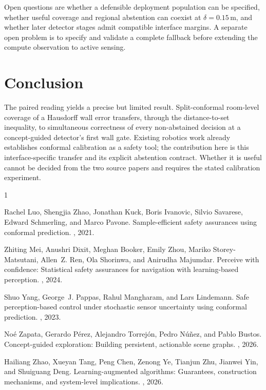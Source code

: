 \documentclass{article}
\begin{document}
Open questions are whether a defensible deployment population can be specified, whether useful coverage and regional abstention can coexist at $\delta=0.15\,\mathrm{m}$, and whether later detector stages admit compatible interface margins. A separate open problem is to specify and validate a complete fallback before extending the compute observation to active sensing.

\section{Conclusion}

The paired reading yields a precise but limited result. Split-conformal room-level coverage of a Hausdorff wall error transfers, through the distance-to-set inequality, to simultaneous correctness of every non-abstained decision at a concept-guided detector's first wall gate. Existing robotics work already establishes conformal calibration as a safety tool; the contribution here is this interface-specific transfer and its explicit abstention contract. Whether it is useful cannot be decided from the two source papers and requires the stated calibration experiment.


\begin{thebibliography}{1}

Rachel Luo, Shengjia Zhao, Jonathan Kuck, Boris Ivanovic, Silvio Savarese,
  Edward Schmerling, and Marco Pavone.
\newblock Sample-efficient safety assurances using conformal prediction.
, 2021.

Zhiting Mei, Anushri Dixit, Meghan Booker, Emily Zhou, Mariko Storey-Matsutani,
  Allen~Z. Ren, Ola Shorinwa, and Anirudha Majumdar.
\newblock Perceive with confidence: Statistical safety assurances for
  navigation with learning-based perception.
, 2024.

Shuo Yang, George~J. Pappas, Rahul Mangharam, and Lars Lindemann.
\newblock Safe perception-based control under stochastic sensor uncertainty
  using conformal prediction.
, 2023.

No{\'e} Zapata, Gerardo P{\'e}rez, Alejandro Torrej{\'o}n, Pedro N{\'u}{\~n}ez,
  and Pablo Bustos.
\newblock Concept-guided exploration: Building persistent, actionable scene
  graphs.
, 2026.

Hailiang Zhao, Xueyan Tang, Peng Chen, Zenong Ye, Tianjun Zhu, Jianwei Yin, and
  Shuiguang Deng.
\newblock Learning-augmented algorithms: Guarantees, construction mechanisms,
  and system-level implications.
, 2026.

\end{thebibliography}
\end{document}
